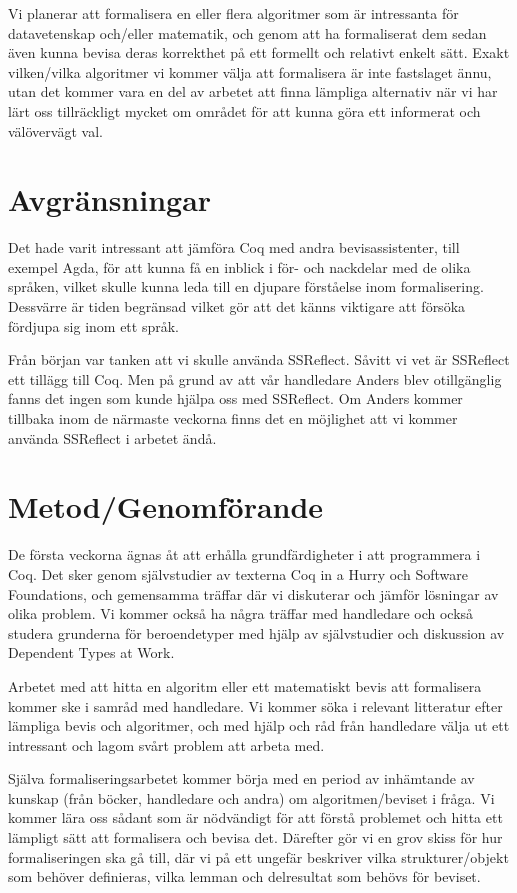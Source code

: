 \documentclass[a4paper]{article}
\begin{document}
Vi planerar att formalisera en eller flera algoritmer som är intressanta för
datavetenskap och/eller matematik, och genom att ha formaliserat dem sedan även
kunna bevisa deras korrekthet på ett formellt och relativt enkelt sätt. Exakt
vilken/vilka algoritmer vi kommer välja att formalisera är inte fastslaget
ännu, utan det kommer vara en del av arbetet att finna lämpliga alternativ när
vi har lärt oss tillräckligt mycket om området för att kunna göra ett
informerat och välövervägt val.

\section*{Avgränsningar}

Det hade varit intressant att jämföra Coq med andra bevisassistenter, till
exempel Agda, för att kunna få en inblick i för- och nackdelar med de olika
språken, vilket skulle kunna leda till en djupare förståelse inom
formalisering. Dessvärre är tiden begränsad vilket gör att det känns viktigare
att försöka fördjupa sig inom ett språk.

Från början var tanken att vi skulle använda SSReflect. Såvitt vi vet är
SSReflect ett tillägg till Coq. Men på grund av att vår handledare Anders blev
otillgänglig fanns det ingen som kunde hjälpa oss med SSReflect. Om Anders
kommer tillbaka inom de närmaste veckorna finns det en möjlighet att vi kommer
använda SSReflect i arbetet ändå.

\section*{Metod/Genomförande}

De första veckorna ägnas åt att erhålla grundfärdigheter i att programmera i
Coq. Det sker genom självstudier av texterna Coq in a Hurry och Software
Foundations, och gemensamma träffar där vi diskuterar och jämför lösningar av
olika problem. Vi kommer också ha några träffar med handledare och också
studera grunderna för beroendetyper med hjälp av självstudier och diskussion av
Dependent Types at Work.

Arbetet med att hitta en algoritm eller ett matematiskt bevis att formalisera
kommer ske i samråd med handledare. Vi kommer söka i relevant litteratur efter
lämpliga bevis och algoritmer, och med hjälp och råd från handledare välja ut
ett intressant och lagom svårt problem att arbeta med.

Själva formaliseringsarbetet kommer börja med en period av inhämtande av
kunskap (från böcker, handledare och andra) om algoritmen/beviset i fråga. Vi
kommer lära oss sådant som är nödvändigt för att förstå problemet och hitta ett
lämpligt sätt att formalisera och bevisa det. Därefter gör vi en grov skiss för
hur formaliseringen ska gå till, där vi på ett ungefär beskriver vilka
strukturer/objekt som behöver definieras, vilka lemman och delresultat som
behövs för beviset.
\end{document}
